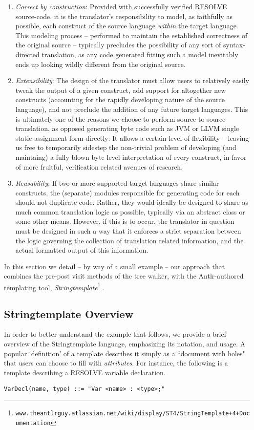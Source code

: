 \documentclass[times]{speauth}
\begin{document}
\begin{enumerate}
\item \textit{Correct by construction}: Provided with successfully verified RESOLVE source-code, it is the translator's responsibility to model, as faithfully as possible, each construct of the source language \textit{within} the target language. This modeling process -- performed to maintain the established correctness of the original source -- typically precludes the possibility of any sort of syntax-directed translation, as any code generated fitting such a model inevitably ends up looking wildly different from the original source.
\item \textit{Extensibility}: The design of the translator must allow users to relatively easily tweak the output of a given construct, add support for altogether new constructs (accounting for the rapidly developing nature of the source language), and not preclude the addition of any future target languages. This is ultimately one of the reasons we choose to perform source-to-source translation, as opposed generating byte code such as JVM or LLVM single static assignment form directly: It allows a certain level of flexibility -- leaving us free to temporarily sidestep the non-trivial problem of developing (and maintaing) a fully blown byte level interpretation of every construct, in favor of more fruitful, verification related avenues of research.
\item \textit{Reusability}: If two or more supported target languages share similar constructs, the (separate) modules responsible for generating code for each should not duplicate code. Rather, they would ideally be designed to share as much common translation logic as possible, typically via an abstract class or some other means. However, if this is to occur, the translator in question must be designed in such a way that it enforces a strict separation between the logic governing the collection of translation related information, and the actual formatted output of this information.
\end{enumerate}

In this section we detail -- by way of a small example -- our approach that combines the pre-post visit methods of the tree walker, with the Antlr-authored templating tool, \textit{Stringtemplate}\footnote[3]{\texttt{www.theantlrguy.atlassian.net/wiki/display/ST4/StringTemplate+4+Documentation}} \cite{parr:2006}.

\subsection{Stringtemplate Overview}
In order to better understand the example that follows, we provide a brief overview of the Stringtemplate language, emphasizing its notation, and usage. A popular `definition' of a template describes it simply as a ``document with holes" that users can choose to fill with \textit{attributes}. For instance, the following is a template describing a RESOLVE variable declaration.
\begin{lstlisting}
VarDecl(name, type) ::= "Var <name> : <type>;"
\end{lstlisting}
\end{document}
